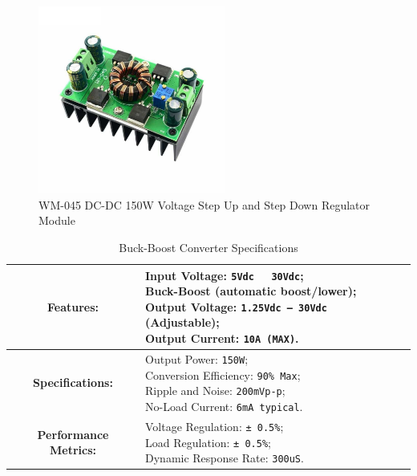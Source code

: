 \documentclass[../../main]{subfiles}
\begin{document}
\newpage
\begin{figure}[H]
    \centering
\includegraphics[width=0.55\textwidth]{fig/actuator_booster.jpg}
\caption{WM-045 DC-DC 150W Voltage Step Up and Step Down Regulator Module }
\label{Linear actuator booster} %
\end{figure}

\begin{table}[ht]
    \centering
    \begin{tabular}{|c|p{10cm}|} %
    \hline
    \textbf{Features:} & \parbox{11cm}{\centering \vspace{5pt}
    Input Voltage: \texttt{5Vdc ~ 30Vdc}; \\
    Buck-Boost (automatic boost/lower); \\
    Output Voltage: \texttt{1.25Vdc -- 30Vdc} (Adjustable);\\
    Output Current: \texttt{10A (MAX)}.\vspace{5pt}} \\ \hline
    \textbf{Specifications:} & \parbox{11cm}{\centering \vspace{5pt}
    Output Power: \texttt{150W}; \\
    Conversion Efficiency: \texttt{90\% Max}; \\
    Ripple and Noise: \texttt{200mVp-p}; \\
    No-Load Current: \texttt{6mA typical}.\vspace{5pt}} \\ \hline
    \textbf{Performance Metrics:} & \parbox{11cm}{\centering \vspace{5pt}
    Voltage Regulation: \texttt{± 0.5\%}; \\
    Load Regulation: \texttt{± 0.5\%}; \\
    Dynamic Response Rate: \texttt{300uS}.\vspace{5pt}} \\ \hline
    \end{tabular}
    \caption{Buck-Boost Converter Specifications}
    \label{Linear actuator booster specifications} %
    \end{table}
\end{document}
